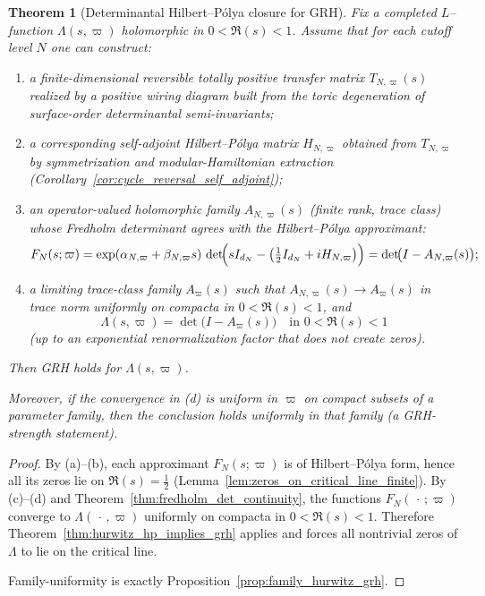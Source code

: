 \documentclass[11pt,oneside]{amsbook}
\numberwithin{equation}{section}
\theoremstyle{plain}
\newtheorem{theorem}{Theorem}[section]
\theoremstyle{definition}
\theoremstyle{remark}
\begin{document}
\begin{theorem}[Determinantal Hilbert--Pólya closure for GRH]
\label{thm:determinantal_HP_GRH}
Fix a completed $L$--function $\Lambda(s,\varpi)$ holomorphic in $0<\Re(s)<1$.
Assume that for each cutoff level $N$ one can construct:
\begin{enumerate}[label=(\alph*)]
\item a finite-dimensional reversible totally positive transfer matrix $T_{N,\varpi}(s)$ realized by a positive wiring diagram built from the toric degeneration of surface-order determinantal semi-invariants;
\item a corresponding self-adjoint Hilbert--Pólya matrix $H_{N,\varpi}$ obtained from $T_{N,\varpi}$ by symmetrization and modular-Hamiltonian extraction (Corollary~\ref{cor:cycle_reversal_self_adjoint});
\item an operator-valued holomorphic family $A_{N,\varpi}(s)$ (finite rank, trace class) whose Fredholm determinant agrees with the Hilbert--Pólya approximant:
\[
F_N(s;\varpi)=\exp(\alpha_{N,\varpi}+\beta_{N,\varpi}s)\,
\det\!\Bigl(sI_{d_N}-\bigl(\tfrac12 I_{d_N}+ i H_{N,\varpi}\bigr)\Bigr)
= \det\!\bigl(I-A_{N,\varpi}(s)\bigr);
\]
\item a limiting trace-class family $A_\varpi(s)$ such that $A_{N,\varpi}(s)\to A_\varpi(s)$ in trace norm uniformly on compacta in $0<\Re(s)<1$, and
\[
\Lambda(s,\varpi)=\det\!\bigl(I-A_\varpi(s)\bigr)
\quad\text{in }0<\Re(s)<1
\]
(up to an exponential renormalization factor that does not create zeros).
\end{enumerate}
Then GRH holds for $\Lambda(s,\varpi)$.

Moreover, if the convergence in (d) is uniform in $\varpi$ on compact subsets of a parameter family, then the conclusion holds uniformly in that family (a GRH-strength statement).
\end{theorem}

\begin{proof}
By (a)--(b), each approximant $F_N(s;\varpi)$ is of Hilbert--Pólya form, hence all its zeros lie on $\Re(s)=\tfrac12$ (Lemma~\ref{lem:zeros_on_critical_line_finite}).
By (c)--(d) and Theorem~\ref{thm:fredholm_det_continuity}, the functions $F_N(\,\cdot\,;\varpi)$ converge to $\Lambda(\,\cdot\,,\varpi)$ uniformly on compacta in $0<\Re(s)<1$.
Therefore Theorem~\ref{thm:hurwitz_hp_implies_grh} applies and forces all nontrivial zeros of $\Lambda$ to lie on the critical line.

Family-uniformity is exactly Proposition~\ref{prop:family_hurwitz_grh}.
\end{proof}
\end{document}
